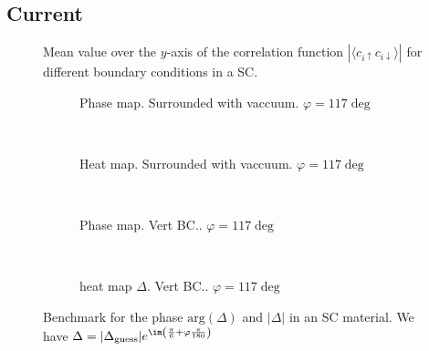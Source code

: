 \documentclass[../main.tex]{subfiles}
\begin{document}
\subsection{Current}

\begin{figure}[H]
    \centering
    
    \caption{Mean value over the $y$-axis of the correlation function $|\langle c_{i\uparrow} c_{i\downarrow}\rangle|$ for different boundary conditions in a SC.}
\end{figure}
\begin{figure}[H]
\begin{subfigure}{0.4\textwidth}
    \centering
    \hspace{-4cm} %
    
    \caption{Phase map. Surrounded with vaccuum. $\varphi = 117\deg$}
    \label{fig:first}
\end{subfigure}    \\
\begin{subfigure}{0.4\textwidth}
    \centering
    \hspace{-4cm} %
    
    \caption{Heat map. Surrounded with vaccuum. $\varphi = 117\deg$}
    \label{fig:first}
\end{subfigure}    \\
\begin{subfigure}{0.4\textwidth}
    \centering
    \hspace{-4cm} %
    
    \caption{Phase map. Vert BC.. $\varphi = 117\deg$}
    \label{fig:first}
\end{subfigure}    \\
\begin{subfigure}{0.4\textwidth}
    \centering
    \hspace{-4cm} %
    
    \caption{heat map $\Delta$. Vert BC.. $\varphi = 117\deg$}
    \label{fig:first}
\end{subfigure}    
\caption{Benchmark for the phase $\text{arg}(\Delta)$ and $|\Delta|$ in an SC material. We have $\Delta = |\Delta_{\text{guess}}|e^{\im \left(\frac{\pi}{6} + \varphi\frac{\pi}{180}\right)}$}

\end{figure}
\end{document}
